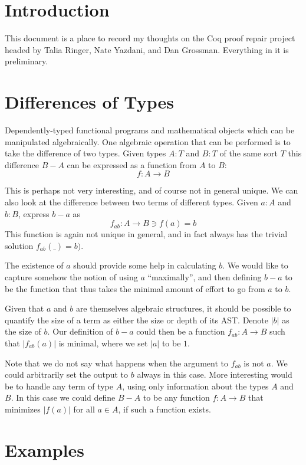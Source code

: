 \documentclass[acmlarge,fleqn]{acmart}\settopmatter{}
\begin{document}
\section{Introduction}

This document is a place to record my thoughts on the Coq proof
repair project headed by Talia Ringer, Nate Yazdani, and Dan
Grossman.  Everything in it is preliminary.

\section{Differences of Types}

Dependently-typed functional programs and mathematical objects which
can be manipulated algebraically.  One algebraic operation that can be
performed is to take the difference of two types.  Given types $A : T$
and $B : T$ of the same sort $T$ this difference $B - A$ can be
expressed as a function from $A$ to $B$:
\[
f : A \to B
\]

This is perhaps not very interesting, and of course not in general
unique.  We can also look at the difference between two terms of
different types.  Given $a : A$ and $b : B$, express $b-a$ as
\[
f_{ab} : A \to B \ni f(a) = b
\]
This function is again not unique in general, and in fact always has
the trivial solution $f_{ab}(\_) = b)$.

The existence of $a$ should provide some help in calculating $b$.  We
would like to capture somehow the notion of using $a$ ``maximally'',
and then defining $b-a$ to be the function that thus takes the minimal
amount of effort to go from $a$ to $b$.

Given that $a$ and $b$ are themselves algebraic structures, it should
be possible to quantify the size of a term as either the size or depth
of its AST.  Denote $|b|$ as the size of $b$.  Our definition of $b-a$
could then be a function $f_{ab} : A \to B$ such that $|f_{ab}(a)|$ is
minimal, where we set $|a|$ to be $1$.

Note that we do not say what happens when the argument to $f_{ab}$ is
not $a$.  We could arbitrarily set the output to $b$ always in this
case.  More interesting would be to handle any term of type $A$, using
only information about the types $A$ and $B$.  In this case we could
define $B - A$ to be any function $f : A \to B$ that minimizes
$|f(a)|$ for all $a \in A$, if such a function exists.

\section{Examples}
\end{document}
